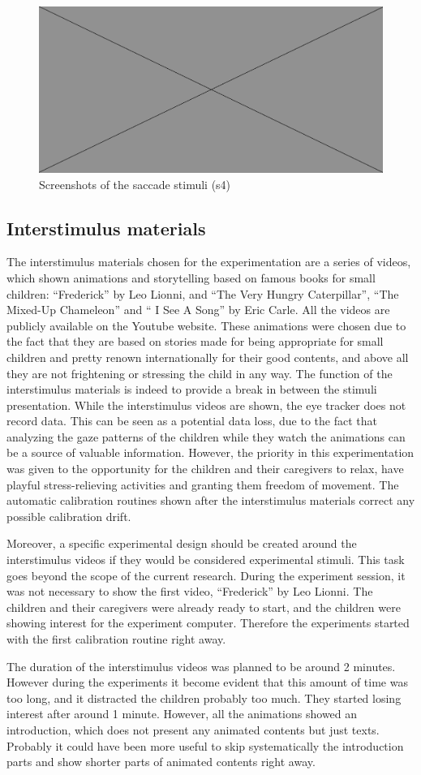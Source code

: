 \begin{figure}[h]
  \centering
  \includegraphics[width=.5\textwidth]{figures/placeholderImg.jpg}
  \caption[saccade stimuli screenshots]{Screenshots of the saccade stimuli (s4)}
  \label{fig:saccadescreens}
\end{figure}

\subsection{Interstimulus materials}
\label{sec:expinterstimulus}

The interstimulus materials chosen for the experimentation are a series of videos, which shown animations and storytelling based on famous books for small children: “Frederick” by Leo Lionni, and “The Very Hungry Caterpillar”, “The Mixed-Up Chameleon” and “ I See A Song” by Eric Carle. All the videos are publicly available on the Youtube website. These animations were chosen due to the fact that they are based on stories made for being appropriate for small children and pretty renown internationally for their good contents, and above all they are not frightening or stressing the child in any way. The function of the interstimulus materials is indeed to provide a break in between the stimuli presentation. While the interstimulus videos are shown, the eye tracker does not record data. This can be seen as a potential data loss, due to the fact that analyzing the gaze patterns of the children while they watch the animations can be a source of valuable information. However, the priority in this experimentation was given to the opportunity for the children and their caregivers to relax, have playful stress-relieving activities and granting them freedom of movement. The automatic calibration routines shown after the interstimulus materials correct any possible calibration drift.

Moreover, a specific experimental design should be created around the interstimulus videos if they would be considered experimental stimuli. This task goes beyond the scope of the current research.
During the experiment session, it was not necessary to show the first video, “Frederick” by Leo Lionni. The children and their caregivers were already ready to start, and the children were showing interest for the experiment computer. Therefore the experiments started with the first calibration routine right away.

The duration of the interstimulus videos was planned to be around 2 minutes. However during the experiments it become evident that this amount of time was too long, and it distracted the children probably too much. They started losing interest after around 1 minute. However, all the animations showed an introduction, which does not present any animated contents but just texts. Probably it could have been more useful to skip systematically the introduction parts and show shorter parts of animated contents right away.
